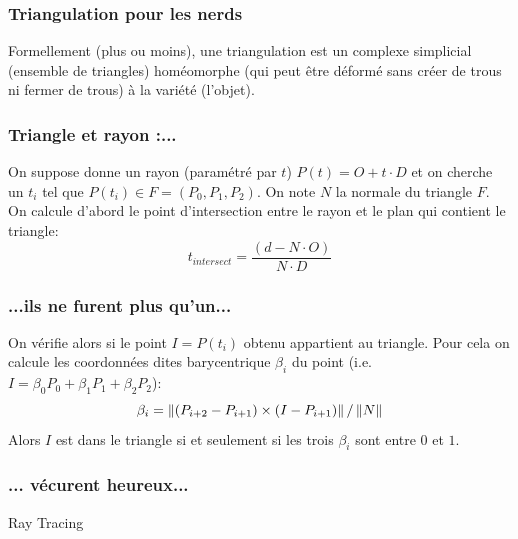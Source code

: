 \documentclass{beamercours}
\begin{document}
\begin{frame}
\frametitle{Triangulation pour les nerds}
\begin{remarque}{}{}
	Formellement (plus ou moins), une triangulation est un complexe simplicial (ensemble de triangles) homéomorphe (qui peut être déformé sans créer de trous ni fermer de trous) à la variété (l'objet).
\end{remarque}
\end{frame}

\begin{frame}
\frametitle{Triangle et rayon :...}
On suppose donne un rayon (paramétré par $t$) $P(t) = O+ t\cdot D$ et on cherche un $t_{i}$ tel que $P(t_{i}) \in F = (P_{0}, P_{1}, P_{2})$.
On note $N$ la normale du triangle $F$.
On calcule d'abord le point d'intersection entre le rayon et le plan qui contient le triangle:
\begin{equation*}
	t_{intersect} = \frac{\left(d - N\cdot O\right)}{N \cdot D}
\end{equation*}
\end{frame}
\begin{frame}
\frametitle{...ils ne furent plus qu'un...}
On vérifie alors si le point $I = P(t_{i})$ obtenu appartient au triangle. Pour cela on calcule les coordonnées dites barycentrique $\beta_{i}$ du point (i.e. $I = \beta_{0}P_{0} + \beta_{1}P_{1} + \beta_{2}P_{2}$):
\begin{equation*}
	\beta_{i} = \left\lVert \left(P_{i + 2} - P_{i + 1}\right) \times \left(I - P_{i + 1}\right) \right\rVert/\left\lVert N \right\rVert
\end{equation*}
Alors $I$ est dans le triangle si et seulement si les trois $\beta_{i}$ sont entre $0$ et $1$.
\end{frame}

\begin{frame}
\frametitle{... vécurent heureux...}
\begin{algorithm}[H]
	\scriptsize
	\caption{Ray Tracing}
	\begin{algorithmic}
				\Else
				\EndIf
			\EndIf
		\EndFunction
	\end{algorithmic}
\end{algorithm}
\end{frame}
\end{document}
